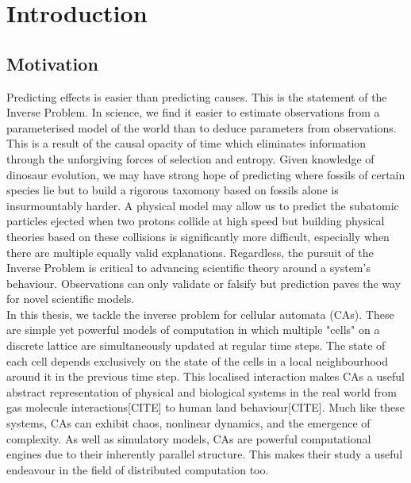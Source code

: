 \chapter{Introduction}

\section{Motivation}

Predicting effects is easier than predicting causes. This is the statement of the Inverse Problem. In science, we find it easier to estimate observations from a parameterised model of the world than to deduce parameters from observations. This is a result of the causal opacity of time which eliminates information through the unforgiving forces of selection and entropy. Given knowledge of dinosaur evolution, we may have strong hope of predicting where fossils of certain species lie but to build a rigorous taxomony based on fossils alone is insurmountably harder. A physical model may allow us to predict the subatomic particles ejected when two protons collide at high speed but building physical theories based on these collisions is significantly more difficult, especially when there are multiple equally valid explanations. Regardless, the pursuit of the Inverse Problem is critical to advancing scientific theory around a system's behaviour. Observations can only validate or falsify but prediction paves the way for novel scientific models.\\

In this thesis, we tackle the inverse problem for cellular automata (CAs). These are simple yet powerful models of computation in which multiple "cells" on a discrete lattice are simultaneously updated at regular time steps. The state of each cell depends exclusively on the state of the cells in a local neighbourhood around it in the previous time step. This localised interaction makes CAs a useful abstract representation of physical and biological systems in the real world from gas molecule interactions[CITE] to human land behaviour[CITE]. Much like these systems, CAs can exhibit chaos, nonlinear dynamics, and the emergence of complexity. As well as simulatory models, CAs are powerful computational engines due to their inherently parallel structure. This makes their study a useful endeavour in the field of distributed computation too.\\

